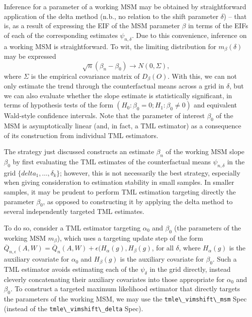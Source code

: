 \documentclass[
  12pt, krantz2,
]{krantz}
\newcommand{\passthrough}[1]{#1}
\theoremstyle{definition}
\theoremstyle{definition}
\theoremstyle{definition}
\newcommand{\1}{\mathbbm{1}}
\begin{document}
Inference for a parameter of a working MSM may be obtained by straightforward
application of the delta method (n.b., no relation to the shift parameter
\(\delta\)) -- that is, as a result of expressing the EIF of the MSM parameter
\(\beta\) in terms of the EIFs of each of the corresponding estimates
\(\psi_{n,\delta}\). Due to this convenience, inference on a working MSM is
straightforward. To wit, the limiting distribution for \(m_{\beta}(\delta)\) may
be expressed \[\sqrt{n}(\beta_n - \beta_0) \to N(0, \Sigma),\] where \(\Sigma\) is
the empirical covariance matrix of \(D_{\beta}(O)\). With this, we can not only
estimate the trend through the counterfactual means across a grid in \(\delta\),
but we can also evaluate whether the slope estimate is statistically
significant, in terms of hypothesis tests of the form \((H_0: \beta_0 = 0; H_1: \beta_0 \neq 0)\) and equivalent Wald-style confidence intervals. Note that the
parameter of interest \(\beta_0\) of the MSM is asymptotically linear (and, in
fact, a TML estimator) as a consequence of its construction from individual TML
estimators.

The strategy just discussed constructs an estimate \(\beta_n\) of the working MSM
slope \(\beta_0\) by first evaluating the TML estimates of the counterfactual
means \(\psi_{n,\delta}\) in the grid \(\{delta_1, \ldots, \delta_k\}\); however,
this is not necessarily the best strategy, especially when giving consideration
to estimation stability in small samples. In smaller samples, it may be prudent
to perform TML estimation targeting directly the parameter \(\beta_0\), as opposed
to constructing it by applying the delta method to several independently
targeted TML estimates.

To do so, consider a TML estimator targeting \(\alpha_0\) and \(\beta_0\) (the
parameters of the working MSM \(m_{\beta}\)), which uses a targeting update step
of the form \(\overline{Q}_{n, \epsilon}(A,W) = \overline{Q}_n(A,W) + \epsilon (H_{\alpha}(g), H_{\beta}(g)\), for all \(\delta\), where \(H_{\alpha}(g)\) is the
auxiliary covariate for \(\alpha_0\) and \(H_{\beta}(g)\) is the auxiliary covariate
for \(\beta_0\). Such a TML estimator avoids estimating each of the
\(\psi_{\delta}\) in the grid directly, instead cleverly concatenating their
auxiliary covariates into those appropriate for \(\alpha_0\) and \(\beta_0\). To
construct a targeted maximum likelihood estimator that directly targets the
parameters of the working MSM, we may use the \passthrough{\lstinline!tmle\_vimshift\_msm!} Spec (instead
of the \passthrough{\lstinline!tmle\_vimshift\_delta!} Spec).
\end{document}

